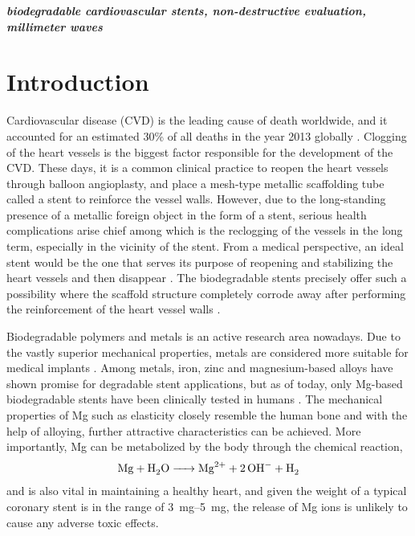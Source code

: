 \documentclass[conference,a4paper]{IEEEtran}
\begin{document}
\textbf{\small{\emph{biodegradable cardiovascular stents, non-destructive evaluation, millimeter waves}}}


%
\IEEEpeerreviewmaketitle

\vspace{7pt}
\section{Introduction}
Cardiovascular disease (CVD) is the leading cause of death worldwide, and it accounted for an estimated 30\% of all deaths in the year 2013 globally \cite{benjamin_heart_2017}. Clogging of the heart vessels is the biggest factor responsible for the development of the CVD. These days, it is a common clinical practice to reopen the heart vessels through balloon angioplasty, and place a mesh-type metallic scaffolding tube called a stent to reinforce the vessel walls.  However, due to the long-standing presence of a metallic foreign object in the form of a stent, serious health complications arise chief among which is the reclogging of the vessels in the long term, especially in the vicinity of the stent. From a medical perspective, an ideal stent would be the one that serves its purpose of reopening and stabilizing the heart vessels and then disappear \cite{waksman_biodegradable_2006}.  The biodegradable stents  precisely offer such a possibility where the scaffold structure completely corrode away after performing the reinforcement of the heart vessel walls \cite{hou_review_2016}.

Biodegradable polymers and metals is an active research area nowadays. Due to the vastly superior mechanical properties, metals are considered more suitable for medical implants \cite{chen_recent_2014}. Among metals, iron, zinc and magnesium-based alloys have shown promise for degradable stent applications, but as of today, only Mg-based biodegradable stents have been clinically tested in humans \cite{staiger_magnesium_2006,esmaily_fundamentals_2017}. The mechanical properties of Mg such as elasticity closely resemble the human bone \cite{hermawan2018updates} and with the help of alloying, further attractive characteristics can be achieved. More importantly, Mg can be metabolized by the body through the chemical reaction,
%
\begin{align} \notag
  \ce{Mg + H_2O -> Mg^{2+} + 2OH^{-} + H2}
\end{align}
%
and is also vital in maintaining a healthy heart, and given the weight of a typical
coronary stent is in the range of \SIrange{3}{5}{\mg}, the release of Mg ions is unlikely to cause any adverse toxic effects.
\end{document}
